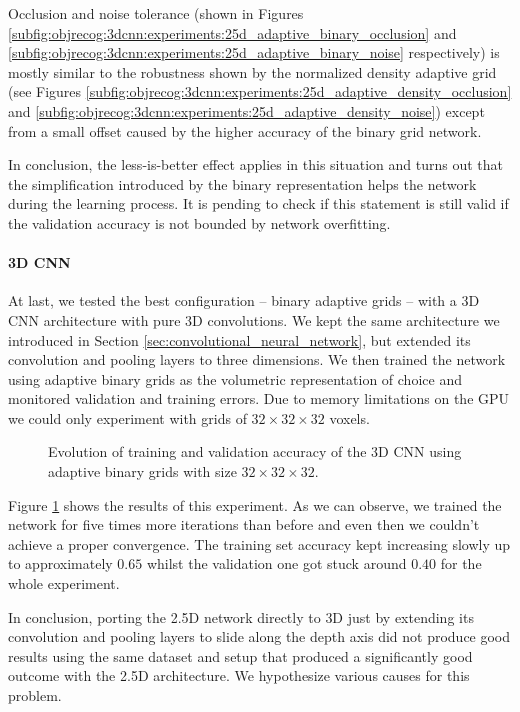 Occlusion and noise tolerance (shown in Figures \ref{subfig:objrecog:3dcnn:experiments:25d_adaptive_binary_occlusion} and \ref{subfig:objrecog:3dcnn:experiments:25d_adaptive_binary_noise} respectively) is mostly similar to the robustness shown by the normalized density adaptive grid (see Figures \ref{subfig:objrecog:3dcnn:experiments:25d_adaptive_density_occlusion} and \ref{subfig:objrecog:3dcnn:experiments:25d_adaptive_density_noise}) except from a small offset caused by the higher accuracy of the binary grid network.

In conclusion, the less-is-better effect applies in this situation and turns out that the simplification introduced by the binary representation helps the network during the learning process. It is pending to check if this statement is still valid if the validation accuracy is not bounded by network overfitting.

\paragraph{3D \ac{CNN}}

At last, we tested the best configuration -- binary adaptive grids -- with a \acs{3D} \acs{CNN} architecture with pure \acs{3D} convolutions. We kept the same architecture we introduced in Section \ref{sec:convolutional_neural_network}, but extended its convolution and pooling layers to three dimensions. We then trained the network using adaptive binary grids as the volumetric representation of choice and monitored validation and training errors. Due to memory limitations on the \acs{GPU} we could only experiment with grids of $32\times32\times32$ voxels.

\begin{figure}[!hbt]
	\centering
	
	\caption{Evolution of training and validation accuracy of the \acs{3D} \acs{CNN} using adaptive binary grids with size $32\times32\times32$.}
	\label{fig:objrecog:3dcnn:experiments:3d}
\end{figure}

Figure \ref{fig:objrecog:3dcnn:experiments:3d} shows the results of this experiment. As we can observe, we trained the network for five times more iterations than before and even then we couldn't achieve a proper convergence. The training set accuracy kept increasing slowly up to approximately $0.65$ whilst the validation one got stuck around $0.40$ for the whole experiment.

In conclusion, porting the \acs{2.5D} network directly to \acs{3D} just by extending its convolution and pooling layers to slide along the depth axis did not produce good results using the same dataset and setup that produced a significantly good outcome with the \acs{2.5D} architecture. We hypothesize various causes for this problem.

